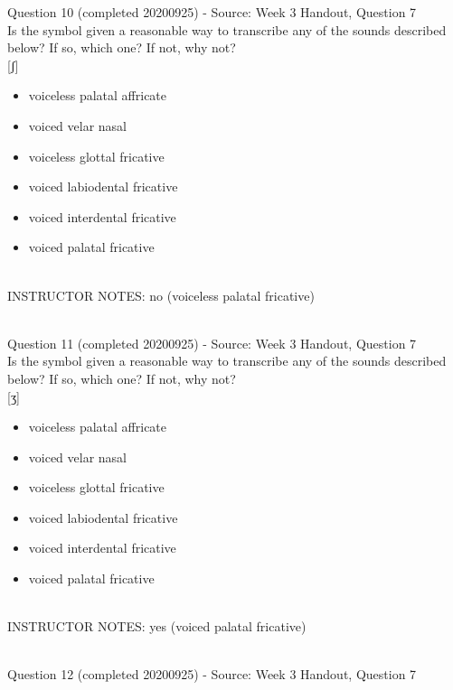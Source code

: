 \documentclass[12pt]{article}
\begin{document}
{\large Question 10} (completed 20200925) - Source: Week 3 Handout, Question 7\\

Is the symbol given a reasonable way to transcribe any of the sounds described below? If so, which one? If not, why not?\\

{[ʃ]}

\begin{itemize} \item voiceless palatal affricate \item voiced velar nasal \item voiceless glottal fricative \item voiced labiodental fricative \item voiced interdental fricative \item voiced palatal fricative \end{itemize}


~\\
INSTRUCTOR NOTES: no (voiceless palatal fricative)


~\\

{\large Question 11} (completed 20200925) - Source: Week 3 Handout, Question 7\\

Is the symbol given a reasonable way to transcribe any of the sounds described below? If so, which one? If not, why not?\\

{[ʒ]}

\begin{itemize} \item voiceless palatal affricate \item voiced velar nasal \item voiceless glottal fricative \item voiced labiodental fricative \item voiced interdental fricative \item voiced palatal fricative \end{itemize}


~\\
INSTRUCTOR NOTES: yes (voiced palatal fricative)


~\\

{\large Question 12} (completed 20200925) - Source: Week 3 Handout, Question 7\\
\end{document}
